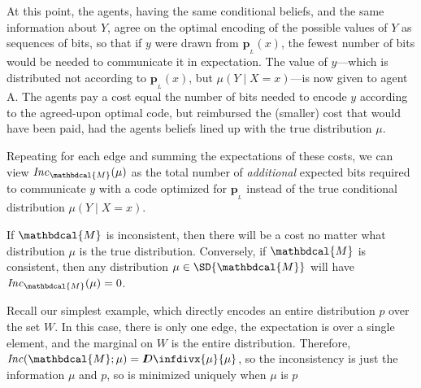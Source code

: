 \documentclass{article}
\theoremstyle{plain}
\theoremstyle{definition}
\theoremstyle{remark}
\newcommand{\thickD}{I\mkern-8muD}
\newcommand{\kldiv}{\thickD\infdivx}
\newcommand\mat[1]{\mathbf{#1}}
\newcommand{\bp}[1][L]{\mat{p}_{\!_{#1}\!}}
\newcommand{\dg}[1]{\mathbdcal{#1}}
\newcommand\Inc{\mathit{Inc}}
\numberwithin{equation}{section}
\begin{document}
\begin{vfull}
At this point, the agents, having the same conditional beliefs, and
the same information about $Y$, agree on the optimal encoding 
of the possible values of $Y$ as sequences of bits, so that if $y$
were drawn from $\bp(x)$, the fewest number of bits would be needed
to communicate it in expectation. The value of $y$---which is distributed
not according to $\bp(x)$, but $\mu(Y \mid X=x)$---is now given to agent A.
The agents pay a cost equal the number of bits needed to encode $y$ according
to the agreed-upon optimal code, but reimbursed the (smaller) cost that would have been paid,
had the agents beliefs lined up with the true distribution $\mu$.

Repeating for each edge and summing the expectations of these costs, we can view
$\Inc_{\dg M}(\mu)$ as the total number of \emph{additional} expected
bits required to communicate $y$ with a code optimized for
$\bp$ instead of the true conditional distribution   $\mu(Y \mid X=x)$. 

If $\dg M$ is inconsistent, then there will be a cost no matter what distribution $\mu$ is the true distribution. Conversely, if $\dg M$ is consistent, then any distribution $\mu \in \SD{\dg M}$ will have $\Inc_{\dg M}( \mu) = 0$.  
\begin{example}[continues=ex:worldsonly]
Recall our simplest example, which directly encodes an entire distribution $p$
over the set $W$. In this case, there is only one edge, the expectation is over
a single element, and the marginal on $W$ is the entire distribution. Therefore,
$\Inc(\dg M; \mu) = \kldiv{\mu}{\mu}$, so the inconsistency is just the
information $\mu$ and $p$, so is minimized uniquely when $\mu$ is $p$
\end{example}
%
\end{vfull}
	
\end{document}
